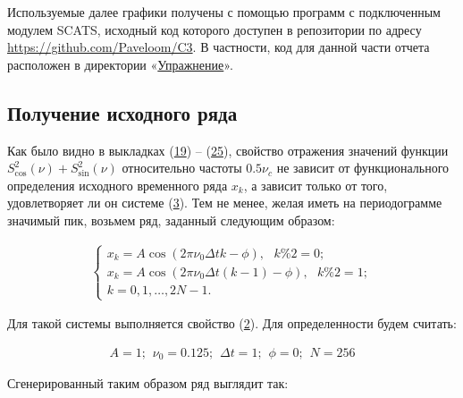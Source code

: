 \documentclass[12pt]{article}
\newcommand{\hl}[1]{(\hyperlink{eq:#1}{#1})}
\newcommand{\sd}[1]{\hypertarget{skip:#1}{\vspace{-10pt}}}
\newcommand{\hep}[2]{\vspace{#2pt}\hypertarget{eq:#1}{}\vspace{-#2pt}}
\newcommand{\hs}[1]{\sd{#1}\hep{#1}{18}}
\newcommand{\hst}[1]{\sd{#1}\hep{#1}{22}}
\begin{document}
Используемые далее графики получены с помощью программ с подключенным модулем SCATS, исходный код которого доступен в репозитории по адресу \\ \href{https://github.com/Paveloom/C3}{https://github.com/Paveloom/C3}. В частности, код для данной части отчета расположен в директории «\href{https://github.com/Paveloom/C3/tree/master/%D0%A3%D0%BF%D1%80%D0%B0%D0%B6%D0%BD%D0%B5%D0%BD%D0%B8%D0%B5}{Упражнение}».

\subsection{Получение исходного ряда}

Как было видно в выкладках \hl{19} -- \hl{25}, свойство отражения значений функции $ S_{\cos}^2(\nu) + S_{\sin}^2(\nu) $ относительно частоты $ 0.5 \nu_{c} $ не зависит от функционального определения исходного временного ряда $ x_{k} $, а зависит только от того, удовлетворяет ли он системе \hl{3}. Тем не менее, желая иметь на периодограмме значимый пик, возьмем ряд, заданный следующим образом:

\hs{27}
\begin{gather}
    \begin{cases}
        x_k = A \cos(2 \pi \nu_{0} \Delta t k - \phi) , \hspace{8pt} k \% 2 = 0; \\
        x_k = A \cos(2 \pi \nu_{0} \Delta t (k - 1) - \phi) , \hspace{8pt} k \% 2 = 1; \\
        k = 0, 1, \ldots, 2 N - 1.
    \end{cases}
\end{gather}

Для такой системы выполняется свойство \hl{2}. Для определенности будем считать:

\hst{28}
\begin{gather}
    A = 1; \hspace{5pt} \nu_{0} = 0.125; \hspace{5pt} \Delta t = 1; \hspace{5pt} \phi = 0; \hspace{5pt} N = 256
\end{gather}

Сгенерированный таким образом ряд выглядит так:
\end{document}
